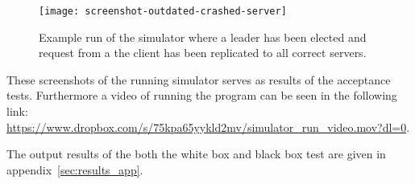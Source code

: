 \begin{figure}[H]
\centering
\texttt{[image: screenshot-outdated-crashed-server]}
\caption{Example run of the simulator where a leader has been elected and request from a the client has been replicated to all correct servers.}
\label{fig:example3}
\end{figure}
These screenshots of the running simulator serves as results of the acceptance tests.
Furthermore a video of running the program can be seen in the following link:\\ \url{https://www.dropbox.com/s/75kpa65yykld2mv/simulator_run_video.mov?dl=0}.

The output results of the both the white box and black box test are given in appendix~\ref{sec:results_app}. 